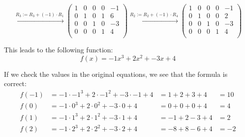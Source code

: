 \documentclass[a4paper]{article}
\begin{document}
\[
\xrightarrow{\text{$R_3 := R_3 + (-1) \cdot R_1$}}
\left(
\begin{array}{cccc|c}
1   & 0   & 0   & 0 & -1  \\
0   & 1   & 0   & 1 & 6  \\
0   & 0   & 1   & 0 & -3  \\
0   & 0   & 0   & 1 & 4   \\
\end{array}
\right)
\xrightarrow{\text{$R_2 := R_2 + (-1) \cdot R_4$}}
\left(
\begin{array}{cccc|c}
1   & 0   & 0   & 0 & -1  \\
0   & 1   & 0   & 0 & 2  \\
0   & 0   & 1   & 0 & -3  \\
0   & 0   & 0   & 1 & 4   \\
\end{array}
\right)
\]

This leads to the following function:
\[f(x) = -1x^3 + 2x^2 + -3x + 4\]

If we check the values in the original equations, we see that the formula is correct:
\begin{align*}
  f(-1) &= -1 \cdot -1^3 + 2 \cdot -1^2 + -3 \cdot -1 + 4 &= 1 + 2 + 3 + 4 &= 10  \\
  f(0) &= -1 \cdot 0^3 + 2 \cdot 0^2 + -3 \cdot 0 + 4 &= 0 + 0 + 0 + 4 &= 4       \\
  f(1) &= -1 \cdot 1^3 + 2 \cdot 1^2 + -3 \cdot 1 + 4 &= -1 + 2 - 3 + 4 &= 2      \\
  f(2) &= -1 \cdot 2^3 + 2 \cdot 2^2 + -3 \cdot 2 + 4 &= -8 + 8 - 6 + 4 &= -2  \\
\end{align*}
\end{document}
